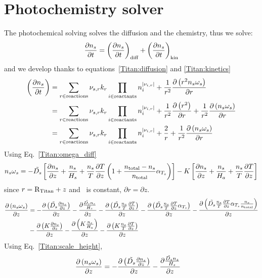 \section{Photochemistry solver}

The photochemical solving solves the diffusion and the chemistry, thus we solve:
\begin{equation}
\frac{\partial n_s}{\partial t} = \left(\frac{\partial n_s}{\partial t}\right)_\text{diff} + \left(\frac{\partial n_s}{\partial t}\right)_\text{kin}
\end{equation}
and we develop thanks to equations~\ref{Titan:diffusion} and \ref{Titan:kinetics}
\begin{equation}
\begin{split}
\left(\frac{\partial n_s}{\partial t}\right) & = \sum_{r\in \text{reactions}} {\nu_{s,r}}k_{r} \prod_{i\in\text{reactants}}n_i^{|{\nu_{i,r}}|} +
                                     \frac{1}{r^2}\frac{\partial\left(r^2n_s\omega_s\right)}{\partial r} \\
                                 & = \sum_{r\in \text{reactions}} {\nu_{s,r}} k_r\prod_{i\in\text{reactants}}n_i^{|{\nu_{i,r}}|} +
                                     \frac{1}{r^2}\frac{\partial\left(r^2\right)}{\partial r} + \frac{1}{r^2}\frac{\partial\left(n_s\omega_s\right)}{\partial r} \\
                                 & = \sum_{r\in \text{reactions}} {\nu_{s,r}} k_{r}\prod_{i\in\text{reactants}}n_i^{|{\nu_{i,r}}|} +
                                     \frac{2}{r} + \frac{1}{r^2}\frac{\partial\left(n_s\omega_s\right)}{\partial r} \\
\end{split}
\end{equation}
Using Eq.~\ref{Titan:omega_diff}
\begin{equation}
n_s\omega_s = -\tilde{D_s} \left[\frac{\partial n_s}{\partial z} + \frac{n_s}{H_s} + 
                                \frac{n_s}{T}\frac{\partial T}{\partial z}\left(1 + \frac{n_\text{total} - n_s}{n_\text{total}}\alpha_{T_s}\right)\right] - 
                  K \left[\frac{\partial n_s}{\partial z} + \frac{n_s}{H_a} + \frac{n_s}{T}\frac{\partial T}{\partial z}\right]
\end{equation}
since $r = \text{R}_\text{Titan} + z$ and \RTitan\ is constant, $\partial r = \partial z$.
\begin{equation}
\begin{split}
\frac{\partial\left(n_s\omega_s\right)}{\partial z} & = -\frac{\partial\left(\tilde{D_s}\frac{\partial n_s}{\partial z}\right)}{\partial z} - \frac{\partial\frac{\tilde{D_s}n_s}{H_s}}{\partial z}
                                - \frac{\partial\left(\tilde{D_s}\frac{n_s}{T}\frac{\partial T}{\partial z}\right)}{\partial z}
                                - \frac{\partial\left(\tilde{D_s}\frac{n_s}{T}\frac{\partial T}{\partial z}\alpha_{T_s}\right)}{\partial z}
                                - \frac{\partial\left(\tilde{D_s}\frac{n_s}{T}\frac{\partial T}{\partial z}\alpha_{T_s}\frac{n_s}{n_\text{total}}\right)}{\partial z} \\
                            &   - \frac{\partial\left(K \frac{\partial n_s}{\partial z}\right)}{\partial z} 
                                - \frac{\partial\left(K\frac{n_s}{H_a}\right)}{\partial z} 
                                - \frac{\partial\left(K\frac{n_s}{T}\frac{\partial T}{\partial z}\right)}{\partial z} \\
\end{split}
\end{equation}
Using Eq.~\ref{Titan:scale_height},
\begin{equation}
\begin{split}
\frac{\partial\left(n_s\omega_s\right)}{\partial z} & = -\frac{\partial\left(\tilde{D_s}\frac{\partial n_s}{\partial z}\right)}{\partial z} - \frac{\partial\frac{\tilde{D_s}n_s}{H_s}}{\partial z}
\end{split}
\end{equation}

